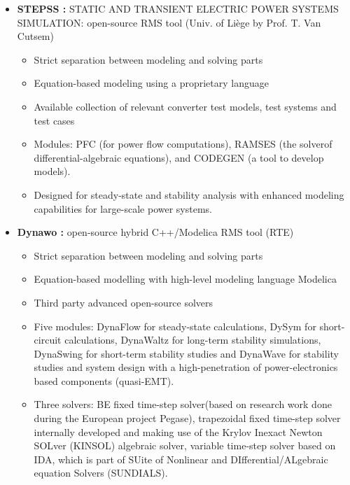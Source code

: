 \documentclass{report}
\begin{document}
\begin{itemize}
    \item \textbf{STEPSS \cite{STEPSS}:} STATIC AND TRANSIENT ELECTRIC POWER SYSTEMS SIMULATION: open-source RMS tool (Univ. of Liège by Prof. T. Van Cutsem)
    \begin{itemize}
        \item Strict separation between modeling and solving parts
        \item Equation-based modeling using a proprietary language
        \item Available collection of relevant converter test models, test systems and test cases
        \item Modules: PFC (for power flow computations), RAMSES (the solverof differential-algebraic equations), and CODEGEN (a tool to develop models).
        \item Designed for steady-state and stability analysis with enhanced modeling capabilities for large-scale power systems.
    \end{itemize}

    \item \textbf{Dynawo \cite{DYNAWO}:} open-source hybrid C++/Modelica RMS tool (RTE)
    \begin{itemize}
        \item Strict separation between modeling and solving parts
        \item Equation-based modelling with high-level modeling language Modelica
        \item Third party advanced open-source solvers
        \item Five modules: DynaFlow for steady-state calculations, DySym for short-circuit calculations, DynaWaltz for long-term stability simulations, DynaSwing for short-term stability studies and DynaWave for stability studies and system design with a high-penetration of power-electronics based components (quasi-EMT).
        \item Three solvers: BE fixed time-step solver(based on research work done during the European project Pegase), trapezoidal fixed time-step solver internally developed and making use of the Krylov Inexact Newton SOLver (KINSOL) algebraic solver, variable time-step solver based on IDA, which is part of SUite of Nonlinear and DIfferential/ALgebraic equation Solvers (SUNDIALS).
    \end{itemize}
    

\end{itemize}
\end{document}
